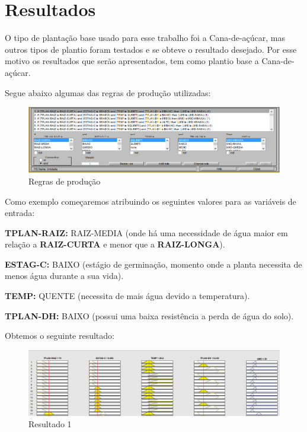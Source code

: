 \section{Resultados}

O tipo de plantação base usado para esse trabalho foi a Cana-de-açúcar, mas outros tipos de plantio foram testados e se obteve o resultado desejado. Por esse motivo os resultados que serão apresentados, tem como plantio base a Cana-de-açúcar.

Segue abaixo algumas das regras de produção utilizadas: 

\begin{figure}[h!]
\centering
\includegraphics[width=1\linewidth]{Resultados/Imagens/regras}
\caption{Regras de produção}
\label{fig:Regras}
\end{figure}

Como exemplo começaremos atribuindo os seguintes valores para as variáveis de entrada:

\textbf{TPLAN-RAIZ:} RAIZ-MEDIA (onde há uma necessidade de água maior em relação a \textbf{RAIZ-CURTA} e menor que a \textbf{RAIZ-LONGA}).

\textbf{ESTAG-C:} BAIXO (estágio de germinação, momento onde a planta necessita de menos água durante a sua vida).

\textbf{TEMP:} QUENTE (necessita de mais água devido a temperatura).

\textbf{TPLAN-DH:} BAIXO (possui uma baixa resistência a perda de água do solo).

Obtemos o seguinte resultado:

\begin{figure}[h!]
\centering
\includegraphics[width=1\linewidth]{Resultados/Imagens/resultado1}
\caption{Resultado 1}
\label{fig:resultado1}
\end{figure}

